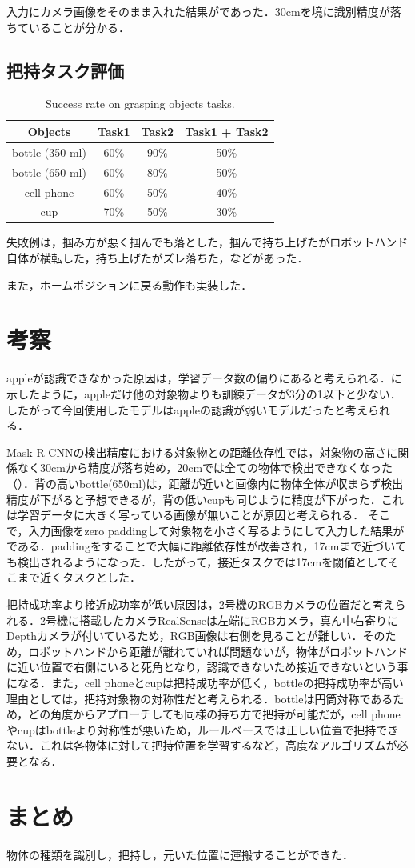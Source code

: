 入力にカメラ画像をそのまま入れた結果がであった．30cmを境に識別精度が落ちていることが分かる．

\subsection{把持タスク評価}


\begin{table}[H]
    \centering
    \caption{Success rate on grasping objects tasks.}
    \begin{tabular}{cccc}\toprule
        Objects & Task1 & Task2 & Task1 + Task2 \\ \midrule
        bottle (350 ml) & 60\% & 90\% & 50\% \\
        bottle (650 ml) & 60\% & 80\% & 50\% \\
        cell phone & 60\% & 50\% & 40\% \\ 
        cup & 70\% & 50\% & 30\% \\ \bottomrule
    \end{tabular} 
    \label{tab:把持成功率}
\end{table}

失敗例は，掴み方が悪く掴んでも落とした，掴んで持ち上げたがロボットハンド自体が横転した，持ち上げたがズレ落ちた，などがあった．

また，ホームポジションに戻る動作も実装した．


\section{考察}
appleが認識できなかった原因は，学習データ数の偏りにあると考えられる．に示したように，appleだけ他の対象物よりも訓練データが3分の1以下と少ない．したがって今回使用したモデルはappleの認識が弱いモデルだったと考えられる．

Mask R-CNNの検出精度における対象物との距離依存性では，対象物の高さに関係なく30cmから精度が落ち始め，20cmでは全ての物体で検出できなくなった（）．背の高いbottle(650ml)は，距離が近いと画像内に物体全体が収まらず検出精度が下がると予想できるが，背の低いcupも同じように精度が下がった．これは学習データに大きく写っている画像が無いことが原因と考えられる．
そこで，入力画像をzero paddingして対象物を小さく写るようにして入力した結果がである．paddingをすることで大幅に距離依存性が改善され，17cmまで近づいても検出されるようになった．したがって，接近タスクでは17cmを閾値としてそこまで近くタスクとした．

把持成功率より接近成功率が低い原因は，2号機のRGBカメラの位置だと考えられる．2号機に搭載したカメラRealSenseは左端にRGBカメラ，真ん中右寄りにDepthカメラが付いているため，RGB画像は右側を見ることが難しい．そのため，ロボットハンドから距離が離れていれば問題ないが，物体がロボットハンドに近い位置で右側にいると死角となり，認識できないため接近できないという事になる．また，cell phoneとcupは把持成功率が低く，bottleの把持成功率が高い理由としては，把持対象物の対称性だと考えられる．bottleは円筒対称であるため，どの角度からアプローチしても同様の持ち方で把持が可能だが，cell phoneやcupはbottleより対称性が悪いため，ルールベースでは正しい位置で把持できない．これは各物体に対して把持位置を学習するなど，高度なアルゴリズムが必要となる．

\section{まとめ}
物体の種類を識別し，把持し，元いた位置に運搬することができた．



